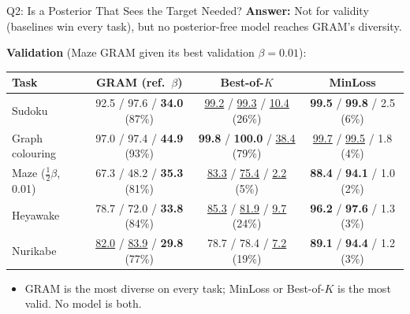 \documentclass[aspectratio=169,10pt]{beamer}
\newcommand{\secbest}[1]{\underline{#1}}
\newcommand{\Bok}{Best-of-$K$}
\begin{document}
\begin{frame}{Q2: Is a Posterior That Sees the Target Needed?}
  \textbf{Answer:} Not for validity (baselines win every task), but no posterior-free model reaches GRAM's diversity.

  \vspace{0.8em}
  \centering
  \footnotesize
  \textbf{Validation} (Maze GRAM given its best validation $\beta = 0.01$):\\[0.4em]
  \begin{tabular}{@{}lccc@{}}
    \toprule
    \textbf{Task} & \textbf{GRAM (ref.\ $\beta$)} & \textbf{\Bok{}} & \textbf{MinLoss} \\
    \midrule
    Sudoku & 92.5 / 97.6 / \textbf{34.0} (87\%) & \secbest{99.2} / \secbest{99.3} / \secbest{10.4} (26\%) & \textbf{99.5} / \textbf{99.8} / 2.5 (6\%) \\
    Graph colouring & 97.0 / 97.4 / \textbf{44.9} (93\%) & \textbf{99.8} / \textbf{100.0} / \secbest{38.4} (79\%) & \secbest{99.7} / \secbest{99.5} / 1.8 (4\%) \\
    Maze ($\frac{1}{2}\beta$, 0.01) & 67.3 / 48.2 / \textbf{35.3} (81\%) & \secbest{83.3} / \secbest{75.4} / \secbest{2.2} (5\%) & \textbf{88.4} / \textbf{94.1} / 1.0 (2\%) \\
    Heyawake & 78.7 / 72.0 / \textbf{33.8} (84\%) & \secbest{85.3} / \secbest{81.9} / \secbest{9.7} (24\%) & \textbf{96.2} / \textbf{97.6} / 1.3 (3\%) \\
    Nurikabe & \secbest{82.0} / \secbest{83.9} / \textbf{29.8} (77\%) & 78.7 / 78.4 / \secbest{7.2} (19\%) & \textbf{89.1} / \textbf{94.4} / 1.2 (3\%) \\
    \bottomrule
  \end{tabular}


  \vspace{0.8em}
  \raggedright\small
  \begin{itemize}
      \item GRAM is the most diverse on every task; MinLoss or \Bok{} is the most valid. No model is both.
  \end{itemize}
\end{frame}


\end{document}
